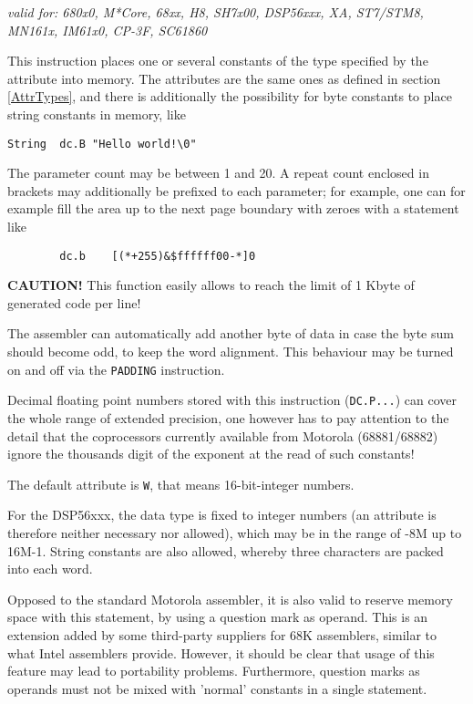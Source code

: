 \documentclass[12pt,twoside]{report}
\newcommand{\bb}[1]{{\bf #1}}
\newcommand{\tty}[1]{{\tt #1}}
\begin{document}
{\em valid for: 680x0, M*Core, 68xx, H8, SH7x00, DSP56xxx, XA,
  ST7/STM8, MN161x, IM61x0, CP-3F, SC61860}

This instruction places one or several constants of the type
specified by the attribute into memory.  The attributes are the same ones as
defined in section \ref{AttrTypes}, and there is additionally the
possibility for byte constants to place string constants in memory, like
\begin{verbatim}
String  dc.B "Hello world!\0"
\end{verbatim}
The parameter count may be between 1 and 20.  A repeat count enclosed
in brackets may additionally be prefixed to each parameter; for
example, one can for example fill the area up to the next page
boundary with zeroes with a statement like
\begin{verbatim}
        dc.b    [(*+255)&$ffffff00-*]0
\end{verbatim}
\bb{CAUTION!}  This function easily allows to reach the limit of 1 Kbyte
of generated code per line!

The assembler can automatically add another byte of data in case the byte sum
should become odd, to keep the word alignment.  This behaviour may be
turned on and off via the \tty{PADDING} instruction.

Decimal floating point numbers stored with this instruction (\tty{DC.P...})
can cover the whole range of extended precision, one however has to
pay attention to the detail that the coprocessors currently available
from Motorola (68881/68882) ignore the thousands digit of the
exponent at the read of such constants!

The default attribute is \tty{W}, that means 16-bit-integer numbers.

For the DSP56xxx, the data type is fixed to integer numbers (an attribute is
therefore neither necessary nor allowed), which may be in the range
of -8M up to 16M-1.  String constants are also allowed, whereby three characters
are packed into each word.

Opposed to the standard Motorola assembler, it is also valid to reserve
memory space with this statement, by using a question mark as operand.
This is an extension added by some third-party suppliers for 68K
assemblers, similar to what Intel assemblers provide.  However, it should
be clear that usage of this feature may lead to portability problems.
Furthermore, question marks as operands must not be mixed with 'normal'
constants in a single statement.
\end{document}
